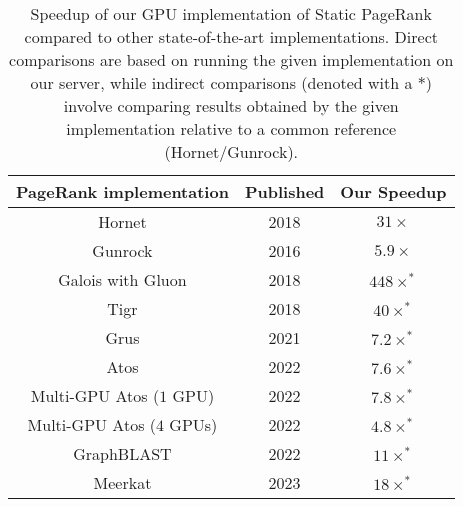 \begin{table}[hbtp]
  \centering
  \caption{Speedup of our GPU implementation of Static PageRank compared to other state-of-the-art implementations. Direct comparisons are based on running the given implementation on our server, while indirect comparisons (denoted with a $*$) involve comparing results obtained by the given implementation relative to a common reference (Hornet/Gunrock).}
  \label{tab:compare-large}
  \begin{tabular}{|c|c||c|}
    \toprule
    \textbf{PageRank implementation} &
    \textbf{Published} &
    \textbf{Our Speedup} \\
    \midrule
    Hornet \cite{busato2018hornet} & 2018 & $31\times$ \\ \hline
    Gunrock \cite{wang2016gunrock} & 2016 & $5.9\times$ \\ \hline
    Galois with Gluon \cite{dathathri2018gluon} & 2018 & $448\times^*$ \\ \hline
    Tigr \cite{nodehi2018tigr} & 2018 & $40\times^*$ \\ \hline
    Grus \cite{wang2021grus} & 2021 & $7.2\times^*$ \\ \hline
    Atos \cite{chen2022atos} & 2022 & $7.6\times^*$ \\ \hline
    Multi-GPU Atos ($1$ GPU) \cite{chen2022scalable} & 2022 & $7.8\times^*$ \\ \hline
    Multi-GPU Atos ($4$ GPUs) \cite{chen2022scalable} & 2022 & $4.8\times^*$ \\ \hline
    GraphBLAST \cite{yang2022graphblast} & 2022 & $11\times^*$ \\ \hline
    Meerkat \cite{concessao2023meerkat} & 2023 & $18\times^*$ \\ \hline
  \bottomrule
  \end{tabular}
\end{table}
